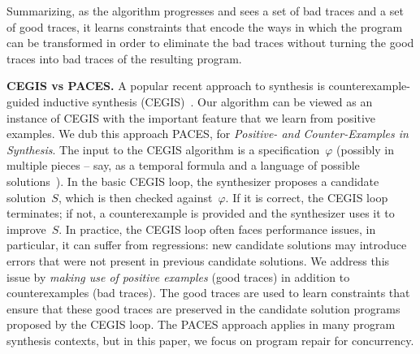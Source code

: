 \documentclass{llncs}
\begin{document}
Summarizing, as the algorithm progresses and sees a set of bad
traces and a set of good traces, it learns constraints that encode the ways
in which the program can be transformed in order to eliminate the 
bad traces without turning the good traces into bad traces of the
resulting program. 

\noindent
{\bf CEGIS vs PACES.}
A popular recent approach to synthesis is counterexample-guided 
inductive synthesis (CEGIS)~\cite{asplos06}.
Our algorithm can be viewed as an instance of CEGIS with the important
feature that we learn from positive examples.
We dub this approach PACES, for {\em Positive- and Counter-Examples in
Synthesis}.
The input to the CEGIS algorithm is a specification~$\varphi$ 
(possibly in multiple pieces -- say, as a temporal formula and a
language of possible solutions~\cite{sygus}).  
In the basic CEGIS loop, the synthesizer proposes a 
candidate solution~$S$, which is then checked against~$\varphi$.  
If it is correct, the CEGIS loop terminates; if not, a counterexample is 
provided and the synthesizer uses it to improve~$S$.
In practice, the CEGIS loop often faces performance issues, in particular, 
it can suffer from regressions: new candidate solutions may introduce 
errors that were not present in previous candidate solutions.
We address this issue by {\em making use of positive examples} (good 
traces) in addition to counterexamples (bad traces). The good traces
are used to learn constraints that ensure that these good traces are
preserved in the candidate solution programs proposed by the CEGIS loop. 
The PACES approach applies in many program synthesis contexts, but in
this paper, we focus on program repair for concurrency.
\end{document}
